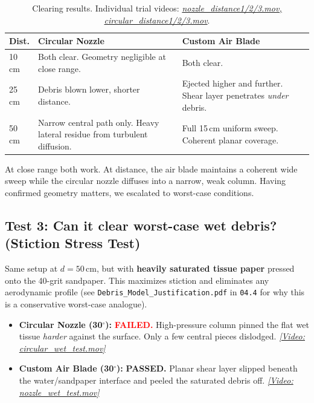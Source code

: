 \documentclass[12pt, letterpaper]{article}
\begin{document}
\vspace{-2pt}
\begin{table}[H]
\centering\small
\caption{Clearing results. Individual trial videos: \href{https://drive.google.com/drive/folders/1RAJA95EF-XjMrkhjWkuoIBbONH_DbRVu}{\textit{nozzle\_distance1/2/3.mov, circular\_distance1/2/3.mov}}.}
\label{tab:clearing}
\begin{tabularx}{\textwidth}{@{}l X X@{}}
\toprule
\textbf{Dist.} & \textbf{Circular Nozzle} & \textbf{Custom Air Blade} \\
\midrule
10\,cm & Both clear. Geometry negligible at close range. & Both clear. \\
25\,cm & Debris blown lower, shorter distance. & Ejected higher and further. Shear layer penetrates \textit{under} debris. \\
50\,cm & Narrow central path only. Heavy lateral residue from turbulent diffusion. & Full 15\,cm uniform sweep. Coherent planar coverage. \\
\bottomrule
\end{tabularx}
\end{table}

\vspace{-4pt}
At close range both work. At distance, the air blade maintains a coherent wide sweep while the circular nozzle diffuses into a narrow, weak column. Having confirmed geometry matters, we escalated to worst-case conditions.

\subsection{Test 3: Can it clear worst-case wet debris? (Stiction Stress Test)}

Same setup at $d = 50$\,cm, but with \textbf{heavily saturated tissue paper} pressed onto the 40-grit sandpaper. This maximizes stiction and eliminates any aerodynamic profile (see \texttt{Debris\_Model\_Justification.pdf} in \texttt{04.4} for why this is a conservative worst-case analogue).

\begin{itemize}
    \item \textbf{Circular Nozzle (30$^\circ$):} \textcolor{red}{\textbf{FAILED.}} High-pressure column pinned the flat wet tissue \textit{harder} against the surface. Only a few central pieces dislodged.
    \href{https://drive.google.com/file/d/1wO-Wh8iFGygEvBvc3OOH91XQSwhoY_Ws/view}{\textit{[Video: circular\_wet\_test.mov]}}
    \item \textbf{Custom Air Blade (30$^\circ$):} \textcolor{green!50!black}{\textbf{PASSED.}} Planar shear layer slipped beneath the water/sandpaper interface and peeled the saturated debris off.
    \href{https://drive.google.com/file/d/16htpF3ptwKEM5UxYE679x3f3xWmt80h1/view}{\textit{[Video: nozzle\_wet\_test.mov]}}
\end{itemize}
\end{document}
